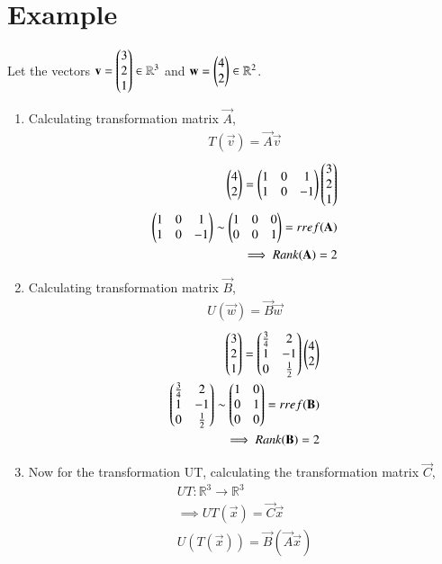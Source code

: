 \documentclass[journal,12pt,twocolumn]{IEEEtran}
\numberwithin{table}{section}
\begin{document}
\section{Example}
Let the vectors $\mathbf{v}=\begin{pmatrix}3\\2\\1\end{pmatrix} \in \mathbb{R}^3$ and $\mathbf{w}=\begin{pmatrix}4\\2\end{pmatrix} \in \mathbb{R}^2$.
\begin{enumerate}
\item Calculating transformation matrix $\vec{A}$,
\begin{align}
T(\vec{v})=\vec{A}\vec{v}
\end{align}
\begin{align}
\begin{pmatrix}4\\2\end{pmatrix}=\begin{pmatrix}1&0&1\\1&0&-1\end{pmatrix}\begin{pmatrix}3\\2\\1\end{pmatrix}\\
\begin{pmatrix}1&0&1\\1&0&-1\end{pmatrix} \sim \begin{pmatrix}1&0&0\\0&0&1\end{pmatrix}=rref(\mathbf{A})\\
\implies Rank(\mathbf{A})=2 \label{RankA}
\end{align}
\item Calculating transformation matrix $\vec{B}$, 
\begin{align}
U(\vec{w})=\vec{B}\vec{w}
\end{align}
\begin{align}
\begin{pmatrix}3\\2\\1\end{pmatrix}=\begin{pmatrix}\frac{3}{4}&2\\1&-1\\0&\frac{1}{2}\end{pmatrix}\begin{pmatrix}4\\2\end{pmatrix}\\
\begin{pmatrix}\frac{3}{4}&2\\1&-1\\0&\frac{1}{2}\end{pmatrix} \sim \begin{pmatrix}1&0\\0&1\\0&0\end{pmatrix}=rref(\mathbf{B})\\
\implies Rank(\mathbf{B})=2 \label{RankB}
\end{align}
\item Now for the transformation UT, calculating the transformation matrix $\vec{C}$,
\begin{align}
UT:\mathbb{R}^3\rightarrow\mathbb{R}^3\\
\implies UT(\vec{x})=\vec{C}\vec{x}\\
U(T(\vec{x}))=\vec{B}(\vec{A}\vec{x})\\

\end{align}
\end{enumerate}
\end{document}
